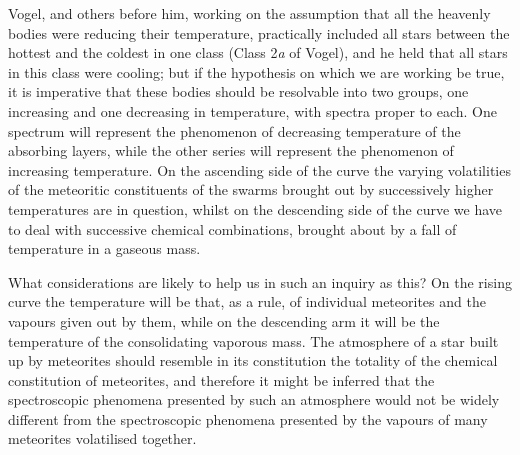 \documentclass[a4paper, 12pt, oneside, polutonikogreek, english]{article}
\begin{document}
Vogel, and others before him, working on the assumption that all the heavenly bodies were reducing their temperature, practically included all stars between the hottest and the coldest in one class (Class 2\emph{a} of Vogel), and he held that all stars in this class were cooling; but if the hypothesis on which we are working be true, it is imperative that these bodies should be resolvable into two groups, one increasing and one decreasing in temperature, with spectra proper to each. One spectrum will represent the phenomenon of decreasing temperature of the absorbing layers, while the other series will represent the phenomenon of increasing temperature. On the ascending side of the curve the varying volatilities of the meteoritic constituents of the swarms brought out by successively higher temperatures are in question, whilst on the descending side of the curve we have to deal with successive chemical combinations, brought about by a fall of temperature in a gaseous mass.

What considerations are likely to help us in such an inquiry as this? On the rising curve the temperature will be that, as a rule, of individual meteorites and the vapours given out by them, while on the descending arm it will be the temperature of the consolidating vaporous mass. The atmosphere of a star built up by meteorites should resemble in its constitution the totality of the chemical constitution of meteorites, and therefore it might be inferred that the spectroscopic phenomena presented by such an atmosphere would not be widely different from the spectroscopic phenomena presented by the vapours of many meteorites volatilised together.
\end{document}
